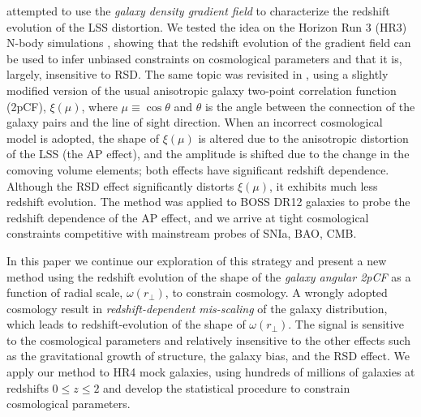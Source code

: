 \documentclass[iop]{emulateapj}
\begin{document}
\cite{Li2014} attempted to use the {\it galaxy density gradient field} 
to characterize the redshift evolution of the LSS distortion. 
We tested the idea on the Horizon Run 3 (HR3) N-body simulations \citep{horizonrun},
showing that the redshift evolution of the gradient field 
can be used to infer unbiased constraints on cosmological parameters and that it is, largely, insensitive to RSD.
The same topic was revisited in \cite{Li2015}, 
using a slightly modified version of the usual anisotropic galaxy two-point correlation function (2pCF), $\xi(\mu)$, 
where $\mu\equiv \cos \theta$ and $\theta$ is the angle between the connection of the galaxy pairs and the line of sight direction.
When an incorrect cosmological model is adopted, 
the shape of $\xi(\mu)$ is altered due to the anisotropic distortion of the LSS (the AP effect), 
and the amplitude is shifted due to the change in the comoving volume elements;
both effects have significant redshift dependence.
Although the RSD effect significantly distorts $\xi(\mu)$, 
it exhibits much less redshift evolution.
The method was applied to BOSS DR12 galaxies \citep{Li2016} to probe the redshift dependence of the AP effect, 
and we arrive at tight cosmological constraints competitive with mainstream probes of SNIa, BAO, CMB.

In this paper we continue our exploration of this strategy and present 
a new method using the redshift evolution of the shape of the {\it galaxy angular 2pCF} as a function of radial scale, $\omega(r_{\bot})$,
to constrain cosmology.
A wrongly adopted cosmology result in {\it redshift-dependent mis-scaling} of the galaxy distribution,
which leads to redshift-evolution of the shape of $\omega(r_{\bot})$.
The signal is sensitive to the cosmological parameters and relatively insensitive to the other effects such as the gravitational growth of structure,
the galaxy bias, and the RSD effect.
We apply our method to HR4 mock galaxies, using hundreds of millions of galaxies at redshifts $0\leq z\leq2$
and develop the statistical procedure to constrain cosmological parameters.
\end{document}
